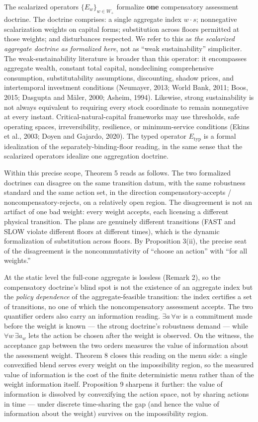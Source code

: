 \documentclass[11pt]{article}
\begin{document}
The scalarized operators \(\{E_w\}_{w \in W_+}\) formalize \textbf{one}
compensatory assessment doctrine. The doctrine comprises: a single
aggregate index \(w \cdot s\); nonnegative scalarization weights on
capital forms; substitution across floors permitted at those weights;
and disturbances respected. We refer to this as \emph{the scalarized
aggregate doctrine as formalized here}, not as ``weak sustainability''
simpliciter. The weak-sustainability literature is broader than this
operator: it encompasses aggregate wealth, constant total capital,
nondeclining comprehensive consumption, substitutability assumptions,
discounting, shadow prices, and intertemporal investment conditions
(Neumayer, 2013; World Bank, 2011; Boos, 2015; Dasgupta and M\"aler, 2000;
Asheim, 1994). Likewise, strong sustainability is not always equivalent
to requiring every stock coordinate to remain nonnegative at every
instant. Critical-natural-capital frameworks may use thresholds, safe
operating spaces, irreversibility, resilience, or minimum-service
conditions (Ekins et al., 2003; Doyen and Gajardo, 2020). The typed
operator \(E_{\mathrm{typ}}\) is a formal idealization of the
separately-binding-floor reading, in the same sense that the scalarized
operators idealize one aggregation doctrine.

Within this precise scope, Theorem 5 reads as follows. The two
formalized doctrines can disagree on the same transition datum, with the
same robustness standard and the same action set, in the direction
compensatory-accepts / noncompensatory-rejects, on a relatively open
region. The disagreement is not an artifact of one bad weight: every
weight accepts, each licensing a different physical transition. The
plans are genuinely different transitions (FAST and SLOW violate
different floors at different times), which is the dynamic formalization
of substitution across floors. By Proposition 3(ii), the precise seat of
the disagreement is the noncommutativity of ``choose an action'' with
``for all weights.''

At the static level the full-cone aggregate is lossless (Remark 2), so
the compensatory doctrine's blind spot is not the existence of an
aggregate index but the \emph{policy dependence} of the
aggregate-feasible transition: the index certifies a set of transitions,
no one of which the noncompensatory assessment accepts. The two
quantifier orders also carry an information reading.
\(\exists a\, \forall w\) is a commitment made before the weight is
known --- the strong doctrine's robustness demand --- while
\(\forall w\, \exists a_w\) lets the action be chosen after the weight
is observed. On the witness, the acceptance gap between the two orders
measures the value of information about the assessment weight. Theorem 8
closes this reading on the menu side: a single convexified blend serves
every weight on the impossibility region, so the measured value of
information is the cost of the finite deterministic menu rather than of
the weight information itself. Proposition 9 sharpens it further: the
value of information is dissolved by convexifying the action space, not
by sharing actions in time --- under discrete time-sharing the gap (and
hence the value of information about the weight) survives on the
impossibility region.
\end{document}
